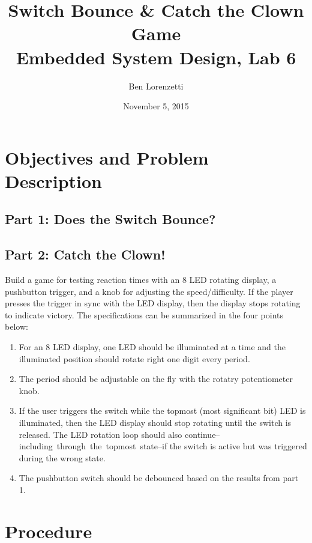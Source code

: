 \documentclass[11pt]{article}
\begin{document}
\title{Switch Bounce \& Catch the Clown Game\\Embedded System Design, Lab 6}
\date{November 5, 2015}
\author{Ben Lorenzetti}
\maketitle

\tableofcontents

\clearpage

\section{Objectives and Problem Description}

\subsection{Part 1: Does the Switch Bounce?}
\label{part-1-problem-specs}

\subsection{Part 2: Catch the Clown!}
\label{part-2-problem-specs}

Build a game for testing reaction times with an 8 LED rotating display,
a pushbutton trigger, and a knob for adjusting the speed/difficulty.
If the player presses the trigger in sync with
the LED display, then the display stops rotating to indicate victory.
The specifications can be summarized in the four points below:
\begin{enumerate}
\item For an 8 LED display, one LED should be illuminated at a time and
the illuminated position should rotate right one digit every period.
\item The period should be adjustable on the fly with the rotatry potentiometer knob.
\item If the user triggers the switch while the topmost (most significant bit) 
LED is illuminated, then the LED display should stop rotating
until the switch is released. The LED rotation loop should also continue--\mbox{including
through the topmost state}--if the switch is active but was triggered
during the wrong state.
\item The pushbutton switch should be debounced based on the results from
part 1.
\end{enumerate}

\section{Procedure}
\end{document}
